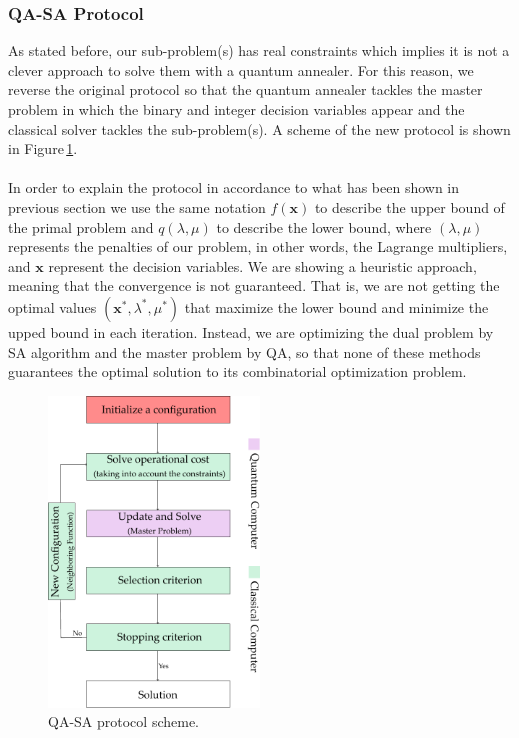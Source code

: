 \subsubsection{QA-SA Protocol}
 As stated before, our sub-problem(s) has real constraints which implies it is not a clever approach to solve them with a quantum annealer. For this reason, we reverse the original protocol so that the quantum annealer tackles the master problem in which the binary and integer decision variables appear and the classical solver tackles the sub-problem(s). A scheme of the new protocol is shown in Figure\,\ref{fig:QA_SAProtocol}.\\\\
In order to explain the protocol in accordance to what has been shown in previous section we use the same notation $f(\mathbf{x})$ to describe the upper bound of the primal problem and $q(\lambda,\mu)$ to describe the lower bound, where $(\lambda,\mu)$ represents the penalties of our problem, in other words, the Lagrange multipliers, and $\mathbf{x}$ represent the decision variables. We are showing a heuristic approach, meaning that the convergence is not guaranteed. That is, we are not getting the optimal values $(\mathbf{x}^{*}, \lambda^{*},\mu^{*})$ that maximize the lower bound and minimize the upped bound in each iteration. Instead, we are optimizing the dual problem by SA algorithm and the master problem by QA, so that none of these methods guarantees the optimal solution to its combinatorial optimization problem.
\begin{figure}[H]
\centering
\includegraphics[width=0.5\textwidth]{Figures/QASAProtocol_Layer 1.pdf} 
\caption{QA-SA protocol scheme.}
\label{fig:QA_SAProtocol}
\end{figure}
